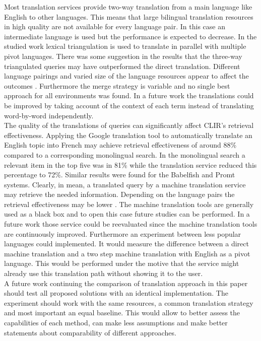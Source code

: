 \documentclass[journal]{IEEEtran}
\begin{document}
Most translation services provide two-way translation from a main language like English to other languages.
This means that large bilingual translation resources in high quality are not available for every language pair.
In this case an intermediate language is used but the performance is expected to decrease.
In the studied work lexical triangulation is used to translate in parallel with multiple pivot languages.
There was some suggestion in the results that the three-way triangulated queries may have outperformed the direct translation.
Different language pairings and varied size of the language resources appear to affect the outcomes \cite{gollins01}.
Furthermore the merge strategy is variable and no single best approach for all environments was found.
In a future work the translations could be improved by taking account of the context of each term instead of translating word-by-word independently.
\mbox{}\\

The quality of the translations of queries can significantly affect CLIR's retrieval effectiveness.
Applying the Google translation tool to automatically translate an English topic into French may achieve retrieval effectiveness of around 88\% compared to a corresponding monolingual search.
In the monolingual search a relevant item in the top five was in 81\% while the translation service reduced this percentage to 72\%.
Similar results were found for the Babelfish and Promt systems.
Clearly, in mean, a translated query by a machine translation service may retrieve the needed information.
Depending on the language pairs the retrieval effectiveness may be lower \cite{savoy09}.
The machine translation tools are generally used as a black box and to open this case future studies can be performed.
In a future work those service could be reevaluated since the machine translation tools are continuously improved.
Furthermore an experiment between less popular languages could implemented.
It would measure the difference between a direct machine translation and a two step machine translation with English as a pivot language.
This would be performed under the motive that the service might already use this translation path without showing it to the user.
\mbox{}\\

A future work continuing the comparison of translation approach in this paper should test all proposed solutions with an identical implementation.
The experiment should work with the same resources, a common translation strategy and most important an equal baseline.
This would allow to better assess the capabilities of each method, can make less assumptions and make better statements about comparability of different approaches.





\end{document}
